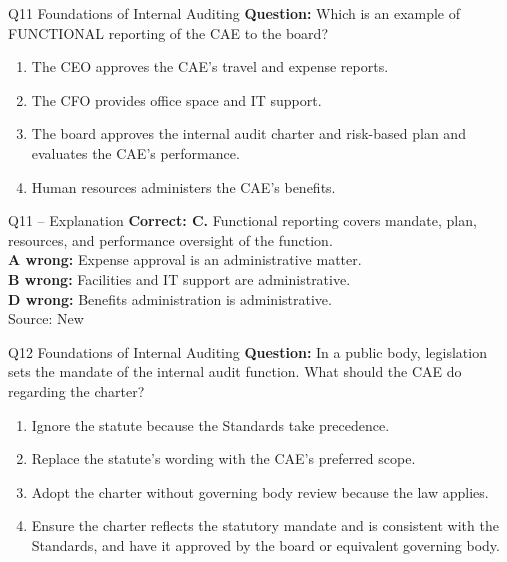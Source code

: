 \documentclass[aspectratio=169,10pt]{beamer}
\begin{document}
\begin{frame}[t]{Q11 \hfill {\scriptsize Foundations of Internal Auditing}}
	\small
	\textbf{Question:} Which is an example of FUNCTIONAL reporting of the CAE to the board?
	\begin{enumerate}[label=\Alph*.,itemsep=1pt,topsep=3pt]
			\item The CEO approves the CAE's travel and expense reports.
			\item The CFO provides office space and IT support.
			\item The board approves the internal audit charter and risk-based plan and evaluates the CAE's performance.
			\item Human resources administers the CAE's benefits.
	\end{enumerate}
\end{frame}

\begin{frame}[t]{Q11 -- Explanation}
	\footnotesize
	\textbf{Correct: C.} Functional reporting covers mandate, plan, resources, and performance oversight of the function. \\[5pt]
\textbf{A wrong:} Expense approval is an administrative matter. \\[3pt]
\textbf{B wrong:} Facilities and IT support are administrative. \\[3pt]
\textbf{D wrong:} Benefits administration is administrative. \\[3pt]
	\vfill {\tiny Source: New}
\end{frame}

\begin{frame}[t]{Q12 \hfill {\scriptsize Foundations of Internal Auditing}}
	\small
	\textbf{Question:} In a public body, legislation sets the mandate of the internal audit function. What should the CAE do regarding the charter?
	\begin{enumerate}[label=\Alph*.,itemsep=1pt,topsep=3pt]
			\item Ignore the statute because the Standards take precedence.
			\item Replace the statute's wording with the CAE's preferred scope.
			\item Adopt the charter without governing body review because the law applies.
			\item Ensure the charter reflects the statutory mandate and is consistent with the Standards, and have it approved by the board or equivalent governing body.
	\end{enumerate}
\end{frame}
\end{document}

